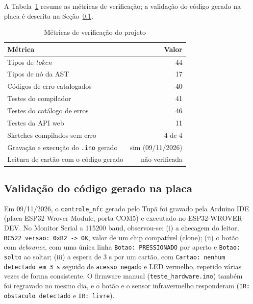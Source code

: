 \documentclass[conference]{IEEEtran}
\begin{document}
A Tabela~\ref{tab:testes} resume as métricas de verificação; a validação do
código gerado na placa é descrita na Seção~\ref{sec:resultados-placa}.

\begin{table}[htbp]
\caption{Métricas de verificação do projeto}
\begin{center}
\footnotesize
\begin{tabular}{lr}
\toprule
\textbf{Métrica} & \textbf{Valor} \\
\midrule
Tipos de \textit{token} & 44 \\
Tipos de nó da AST & 17 \\
Códigos de erro catalogados & 40 \\
Testes do compilador & 41 \\
Testes do catálogo de erros & 46 \\
Testes da API web & 11 \\
Sketches compilados sem erro & 4 de 4 \\
Gravação e execução do \texttt{.ino} gerado & sim (09/11/2026) \\
Leitura de cartão com o código gerado & não verificada \\
\bottomrule
\end{tabular}
\label{tab:testes}
\end{center}
\end{table}


\subsection{Validação do código gerado na placa}\label{sec:resultados-placa}
Em 09/11/2026, o \texttt{controle\_nfc} gerado pelo Tupã foi gravado pela
Arduino IDE (placa ESP32 Wrover Module, porta COM5) e executado no
ESP32-WROVER-DEV. No Monitor Serial a 115200 baud, observou-se: (i) a checagem
do leitor, \texttt{RC522 versao: 0xB2 -> OK}, valor de um chip compatível
(clone); (ii) o botão com \textit{debounce}, com uma única linha
\texttt{Botao: PRESSIONADO} por aperto e \texttt{Botao: solto} ao soltar; (iii)
a espera de 3 s por um cartão, com \texttt{Cartao: nenhum detectado em 3 s}
seguido de \texttt{acesso negado} e LED vermelho, repetido várias vezes de
forma consistente. O firmware manual (\texttt{teste\_hardware.ino}) também foi
regravado no mesmo dia, e o botão e o sensor infravermelho responderam
(\texttt{IR: obstaculo detectado} e \texttt{IR: livre}).
\end{document}
